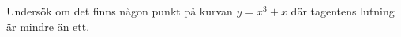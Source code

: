 



Undersök om det finns någon punkt på kurvan $ y = x^3+x $ där tagentens lutning är mindre än ett.